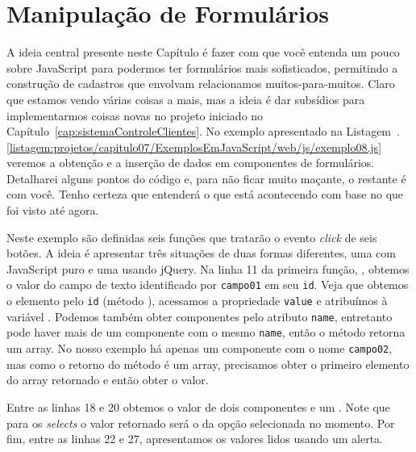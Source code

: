 \section{Manipulação de Formulários}

A ideia central presente neste Capítulo é fazer com que você entenda um pouco sobre JavaScript para podermos ter formulários mais sofisticados, permitindo a construção de cadastros que envolvam relacionamos muitos-para-muitos. Claro que estamos vendo várias coisas a mais, mas a ideia é dar subsídios para implementarmos coisas novas no projeto iniciado no Capítulo~\ref{cap:sistemaControleClientes}. No exemplo apresentado na Listagem~\thechapter.\ref{listagem:projetos/capitulo07/ExemplosEmJavaScript/web/js/exemplo08.js} veremos a obtenção e a inserção de dados em componentes de formulários. Detalharei alguns pontos do código e, para não ficar muito maçante, o restante é com você. Tenho certeza que entenderá o que está acontecendo com base no que foi visto até agora.


Neste exemplo são definidas seis funções que tratarão o evento \textit{click} de seis botões. A ideia é apresentar três situações de duas formas diferentes, uma com JavaScript puro e uma usando jQuery. Na linha 11 da primeira função, , obtemos o valor do campo de texto identificado por \texttt{campo01} em seu \texttt{id}. Veja que obtemos o elemento pelo \texttt{id} (método ), acessamos a propriedade \texttt{value} e atribuímos à variável . Podemos também obter componentes pelo atributo \texttt{name}, entretanto pode haver mais de um componente com o mesmo \texttt{name}, então o método  retorna um array. No nosso exemplo há apenas um componente com o nome \texttt{campo02}, mas como o retorno do método  é um array, precisamos obter o primeiro elemento do array retornado e então obter o valor.

Entre as linhas 18 e 20 obtemos o valor de dois componentes  e um . Note que para os \textit{selects} o valor retornado será o da opção selecionada no momento. Por fim, entre as linhas 22 e 27, apresentamos os valores lidos usando um alerta.

